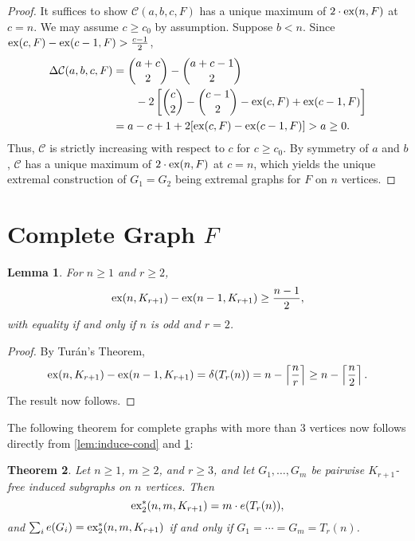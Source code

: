 \documentclass[12pt]{report}
\newtheorem{theorem}{Theorem}[chapter]
\newtheorem{lemma}[theorem]{Lemma}
\newcommand*{\ex}{\textnormal{ex}}
\newcommand*{\dex}{\textnormal{ex}_2}
\newcommand*{\con}{\mathcal{C}}
\begin{document}
\begin{proof}
  It suffices to show $\con(a, b, c, F)$ has a unique maximum of $2 \cdot \ex(n, F)$ at $c = n$. We may assume $c \geq c_0$ by assumption. Suppose $b < n$. Since $\ex(c, F) - \ex(c - 1, F) > \frac{c - 1}{2}$,
  \begin{align*}
    \Delta \con(a, b, c, F)
    &= \binom{a + c}{2} - \binom{a + c - 1}{2} \\
    &\qquad - 2\left[\binom{c}{2} - \binom{c - 1}{2} - \ex(c, F) + \ex(c - 1, F)\right] \\
    &= a - c + 1 + 2[\ex(c, F) - \ex(c - 1, F)] > a \geq 0.
  \end{align*} 
  Thus, $\con$ is strictly increasing with respect to $c$ for $c \geq c_0$. By symmetry of $a$ and $b$, $\con$ has a unique maximum of $2 \cdot \ex(n, F)$ at $c = n$, which yields the unique extremal construction of $G_1 = G_2$ being extremal graphs for $F$ on $n$ vertices.
\end{proof}

\section{Complete Graph $F$}

\begin{lemma}\label{lem:induce-complete-cond}
  For $n \geq 1$ and $r \geq 2$,
  \[
    \ex(n, K_{r + 1}) - \ex(n - 1, K_{r + 1}) \geq \frac{n - 1}{2},
  \]
  with equality if and only if $n$ is odd and $r = 2$.
\end{lemma}

\begin{proof}
  By Turán's Theorem,
  \[
    \ex(n, K_{r + 1}) - \ex(n - 1, K_{r + 1}) = \delta(T_r(n)) = n - \left\lceil \frac{n}{r} \right\rceil \geq n - \left\lceil\frac{n}{2}\right\rceil.
  \]
  The result now follows.
\end{proof}

The following theorem for complete graphs with more than $3$ vertices now follows directly from \cref{lem:induce-cond} and \cref{lem:induce-complete-cond}:

\begin{theorem}\label{thm:induce-complete-no-triangle}
  Let $n \geq 1$, $m \geq 2$, and $r \geq 3$, and let $G_1, \ldots, G_m$ be pairwise $K_{r + 1}$-free induced subgraphs on $n$ vertices. Then
  \[
    \dex^*(n, m, K_{r + 1}) = m \cdot e(T_{r}(n)),
  \]
  and $\sum_i e(G_i) = \dex^*(n, m, K_{r + 1})$ if and only if $G_1 = \cdots = G_m = T_{r}(n)$.
\end{theorem}
\end{document}
